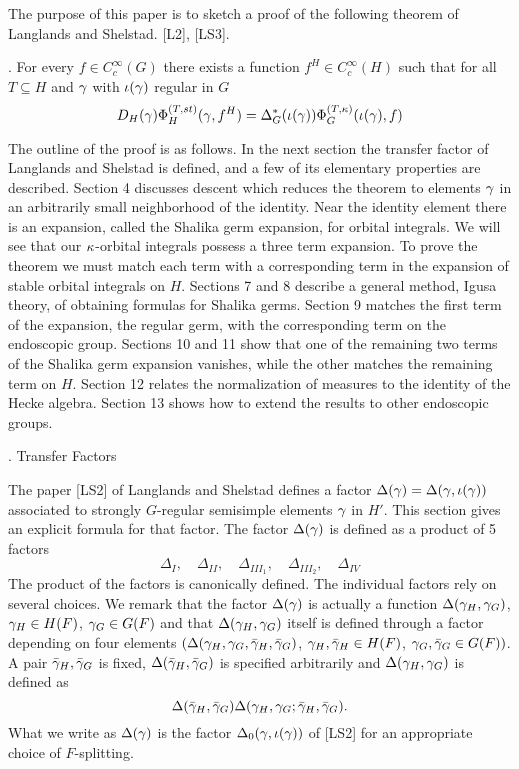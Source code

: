 The purpose of this paper is to sketch a proof of the following theorem
of Langlands and Shelstad.  [L2], [LS3].

.  For every $f \in C_c^\infty(G)$ 
there exists a function $f^H \in C_c^\infty(H)$
such that for all $T \subseteq H$ and ${\gamma}$ with $\iota({\gamma})$ 
regular in $G$ 
$$ D_H({\gamma})\Phi^{(T,st)}_H({\gamma},f^H) = \Delta^*_G(\iota({\gamma}))\Phi^{(T,\kappa)}_G(\iota({\gamma}),f)$$

The outline of the proof is as follows.  In the next section the
transfer factor of Langlands and Shelstad is defined, and a few of
its elementary properties are described.  Section 4 discusses descent
which reduces the theorem to elements ${\gamma}$ in an arbitrarily small
neighborhood of the identity.  Near the identity element there is
an expansion, called the Shalika germ expansion, for orbital 
integrals.  We will see that 
our ${\kappa}$-orbital integrals possess a three term
expansion.  To prove the theorem we must match each term with a
corresponding term in the expansion of stable orbital integrals
on $H$.  Sections 7 and 8 describe a general method, Igusa theory,
of obtaining formulas for Shalika germs.  Section 9 matches the
first term of the expansion, the regular germ, with the corresponding
term on the endoscopic group.  Sections 10 and 11 show that one of
the remaining two terms of the Shalika germ expansion vanishes, while
the other matches the remaining term on $H$.  Section 12 relates
the normalization of measures to the identity of the Hecke
algebra.  Section 13 shows how to extend the results to other
endoscopic groups.

.        Transfer Factors \endsect

The paper [LS2] of Langlands and Shelstad defines a factor 
$\Delta({\gamma}) = \Delta({\gamma},\iota({\gamma}))$ associated to strongly $G$-regular semisimple elements ${\gamma}$ in $H'$.  
This section gives an explicit formula for that factor.  
The factor $\Delta({\gamma})$ is defined as a product of 5 factors  $$\Delta_I,\quad \Delta_{II},\quad \Delta_{III_1},\quad \Delta_{III_2},\quad \Delta_{IV}$$
The product of the factors is canonically defined.  
The individual factors rely on several choices.   We remark 
that the factor $\Delta({\gamma})$ is actually a function $\Delta({\gamma}_H,{\gamma}_G)$,
${\gamma}_H\in H(F)$, ${\gamma}_G\in G(F)$ and that $\Delta({\gamma}_H,{\gamma}_G)$ itself
is defined through a factor depending on four elements $(\Delta({\gamma}_H,
{\gamma}_G,\bar{{\gamma}}_H,\bar{{\gamma}}_G)$, ${\gamma}_H,\bar{{\gamma}}_H \in H(F)$, ${\gamma}_G,\bar{{\gamma}}_G
\in G(F))$.  A pair $\bar{{\gamma}}_H,\bar{{\gamma}}_G$ is fixed, $\Delta(\bar{{\gamma}}_H,
\bar{{\gamma}}_G)$ is specified arbitrarily and $\Delta({\gamma}_H,{\gamma}_G)$ is defined
as $$\Delta(\bar{{\gamma}}_H,\bar{{\gamma}}_G)\Delta({\gamma}_H,{\gamma}_G;\bar{{\gamma}}_H,\bar{{\gamma}}_G).$$ 
What we write as $\Delta({\gamma})$ is the factor $\Delta_0({\gamma},\iota({\gamma}))$
of [LS2] for an appropriate choice of $F$-splitting.


